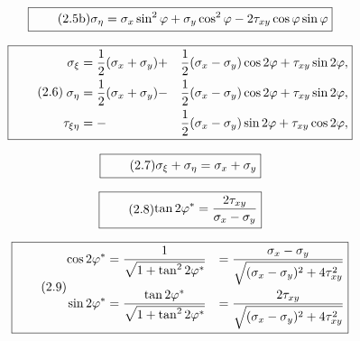 \documentclass[11pt]{article}
\newcommand{\1}{ {\mathds{1}} }
\begin{document}
    \begin{equation}
      \boxed{
        \tag{2.5b}
        \begin{split}
          \sigma_{\eta}
          =
          \sigma_{x} \sin^2 \varphi + \sigma_y \cos^2 \varphi - 2 \tau_{xy} \cos\varphi\sin\varphi
        \end{split}
      }
    \end{equation}

    \begin{equation}
      \boxed{
        \tag{2.6}
        \begin{split}
          \sigma_{\xi} &= \frac{1}{2} (\sigma_x + \sigma_y) +&\frac{1}{2}(\sigma_x - \sigma_y) \cos 2 \varphi + \tau_{xy} \sin 2 \varphi, \\
          \sigma_{\eta} &= \frac{1}{2} (\sigma_x + \sigma_y) -&\frac{1}{2}(\sigma_x - \sigma_y) \cos 2 \varphi + \tau_{xy} \sin 2 \varphi,\\
          \tau_{\xi \eta} &= -&\frac{1}{2}(\sigma_x - \sigma_y) \sin 2 \varphi + \tau_{xy} \cos 2 \varphi,
        \end{split}
      }
    \end{equation}
    
    \begin{equation}
      \boxed{
        \tag{2.7}
        \begin{split}
          \sigma_\xi + \sigma_\eta
          =
          \sigma_x + \sigma_y
        \end{split}
      }
    \end{equation}
    
    \begin{equation}
      \boxed{
        \tag{2.8}
        \begin{split}
          \tan 2\varphi^\ast
          =
          \frac{2 \tau_{xy}}{\sigma_x - \sigma_y}
        \end{split}
      }
    \end{equation}

    \begin{equation}
      \boxed{
        \tag{2.9}
        \begin{split}
          \cos 2\varphi^\ast
          &=
          \frac{1}{\sqrt{1+ \tan^2 2\varphi^\ast}}
          &=
          \frac{\sigma_x - \sigma_y}{\sqrt{(\sigma_x - \sigma_y)^2 + 4 \tau_{xy}^2}} \\
          \sin 2\varphi^\ast
          &=
          \frac{\tan 2\varphi^\ast}{\sqrt{1+ \tan^2 2\varphi^\ast}}
          &=
          \frac{2\tau_{xy}}{\sqrt{(\sigma_x - \sigma_y)^2 + 4 \tau_{xy}^2}} \\          
        \end{split}
      }
    \end{equation}
\end{document}
